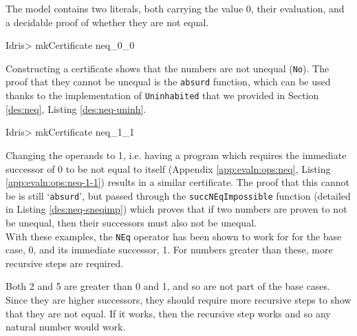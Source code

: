         
        The \Idris model contains two literals, both carrying the value 0, their evaluation, and a decidable proof of whether they are not equal.
        
        \begin{code}
Idris> mkCertificate neq_0_0
        \end{code}
        
        Constructing a certificate shows that the numbers are not unequal (\texttt{No}). The proof that they cannot be unequal is the \texttt{absurd} function, which can be used thanks to the implementation of \texttt{Uninhabited} that we provided in Section \ref{des:neq}, Listing \ref{des:neq-uninh}.
        
        \begin{code}
Idris> mkCertificate neq_1_1
        \end{code}
        
        Changing the operands to 1, i.e. having a program which requires the immediate successor of 0 to be not equal to itself (Appendix \ref{app:evaln:ops:neq}, Listing \ref{app:evaln:ops:neq-1-1}) results in a similar certificate. The proof that this cannot be is still `\texttt{absurd}', but passed through the \texttt{succNEqImpossible} function (detailed in Listing \ref{des:neq-sneqimp}) which proves that if two numbers are proven to not be unequal, then their successors must also not be unequal.
        \\
        
        With these examples, the \texttt{NEq} operator has been shown to work for for the base case, 0, and its immediate successor, 1. For numbers greater than these, more recursive steps are required.
        
        \newpage
    
        
        
        Both 2 and 5 are greater than 0 and 1, and so are not part of the base cases. Since they are higher successors, they should require more recursive steps to show that they are not equal. If it works, then the recursive step works and so any natural number would work.
        

